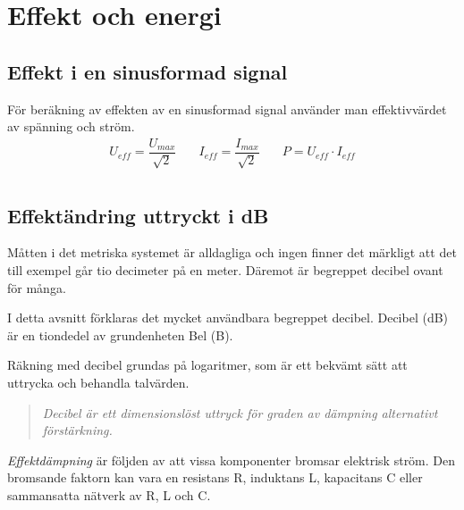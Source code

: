 
\section{Effekt och energi}
\label{effect och energi}

\subsection{Effekt i en sinusformad signal}

För beräkning av effekten av en sinusformad signal använder man effektivvärdet
av spänning och ström.
\[\begin{array}{ccc}
    U_{\textit{eff}} = \dfrac{U_{max}}{\sqrt{2}} &
    \quad I_{\textit{eff}} = \dfrac{I_{max}}{\sqrt{2}} &
    \quad P = U_{\textit{eff}} \cdot I_{\textit{eff}} \\
    \end{array}\]


\subsection{Effektändring uttryckt i dB}
\label{decibel}
\label{effekt_db}

Måtten i det metriska systemet är alldagliga och ingen finner det märkligt att
det till exempel går tio decimeter på en meter.
Däremot är begreppet decibel ovant för många.

I detta avsnitt förklaras det mycket användbara begreppet decibel.
Decibel (dB) är en tiondedel av grundenheten Bel (B).

Räkning med decibel grundas på logaritmer, som är ett bekvämt sätt att uttrycka
och behandla talvärden.

\begin{quote}\emph{
Decibel är ett dimensionslöst uttryck för graden av dämpning alternativt
förstärkning.
}\end{quote}

\emph{Effektdämpning} är följden av att vissa komponenter bromsar elektrisk
ström.
Den bromsande faktorn kan vara en resistans R, induktans L, kapacitans C eller
sammansatta nätverk av R, L och C.


